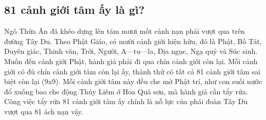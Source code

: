 \subsection{81 cảnh giới tâm ấy là gì?} %
\label{sub:81_canh_gioi_tam}

Ngô Thừa Ân đã khéo dựng lên tám mươi mốt cảnh nạn phải vượt qua trên đường Tây Du. Theo Phật Giáo, có mười cảnh giới hiện hữu, đó là Phật, Bồ Tát, Duyên giác, Thinh văn, Trời, Người, A—tu—la, Địa ngục, Ngạ quỷ và Súc sinh. Muốn đến cảnh giới Phật, hành giả phải đi qua chín cảnh giới còn lại. Mỗi cảnh giới có đủ chín cảnh giới tâm còn lại ấy, thành thử có tất cả 81 cảnh giới tâm sai biệt còn lại (9x9). Mỗi cảnh giới tâm này đều che mờ Phật trí, như con suối nước đổ xuống bao che động Thủy Liêm ở Hoa Quả sơn, mà hành giả cần tẩy rửa. Công việc tẩy rửa 81 cảnh giới tâm ấy chính là nỗ lực của phái đoàn Tây Du vượt qua 81 ách nạn vậy.
